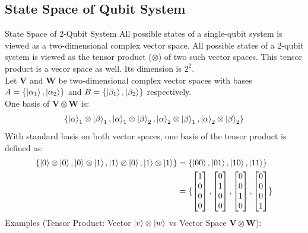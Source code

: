 \documentclass{beamer}
\begin{document}
\subsection{State Space of Qubit System}
\begin{frame}{State Space of 2-Qubit System}
  {\tiny
  All possible states of a single-qubit system is viewed as a two-dimensional complex vector space.
  All possible states of a 2-qubit system is viewed as the tensor product ($\otimes$) of two such vector spaces.
  This tensor product is a vecor space as well. Its dimension is $2^2$.\\
  Let $\mathbf{V}$ and $\mathbf{W}$ be two-dimensional complex vector spaces with
  bases $A=\{\ket{\alpha_1}, \ket{\alpha_2}\}$ and $B=\{\ket{\beta_1}, \ket{\beta_2}\}$ respectively. \\
  One basis of $\mathbf{V} \otimes \mathbf{W}$ is:
  \begin{align*}
    \{\ket\alpha_1 \otimes \ket\beta_1,
       \ket\alpha_1 \otimes \ket\beta_2,
       \ket\alpha_2 \otimes \ket\beta_1,
       \ket\alpha_2 \otimes \ket\beta_2 \}
  \end{align*}
  With standard basis on both vector spaces, one basis of the tensor product is defined as:
  \begin{align*}
    \{\ket0 \otimes \ket0, \ket0 \otimes \ket1, \ket1 \otimes \ket0, \ket1 \otimes \ket1 \}
    &= \{\ket{00}, \ket{01}, \ket{10}, \ket{11} \} \\
    &= \{
      \begin{bmatrix} 1 \\ 0 \\ 0 \\ 0 \end{bmatrix},
      \begin{bmatrix} 0 \\ 1 \\ 0 \\ 0 \end{bmatrix},
      \begin{bmatrix} 0 \\ 0 \\ 1 \\ 0 \end{bmatrix},
      \begin{bmatrix} 0 \\ 0 \\ 0 \\ 1 \end{bmatrix}
    \}
  \end{align*}
  Examples (Tensor Product: Vector $\ket{v} \otimes \ket{w}$ vs Vector Space $\mathbf{V} \otimes \mathbf{W}$): \\
}
\end{frame}
\end{document}
